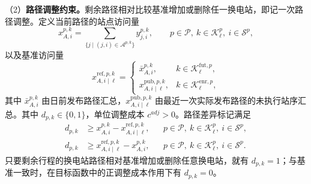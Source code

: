 \documentclass[12pt,a4paper,UTF8]{ctexart}
\begin{document}
（2）\textbf{路径调整约束。}剩余路径相对比较基准增加或删除任一换电站，即记一次路径调整。定义当前路径的站点访问量
\begin{equation}
x_{A,i}^{p,k}
=
\sum_{\{j\mid(j,i)\in\mathcal A^{p,k}\}}y_{j,i}^{p,k},
\qquad p\in\mathcal P,\ k\in\mathcal K_\ell^p,\ i\in\mathcal S^p,
\label{eq:station_visit_indicator}
\end{equation}
以及基准访问量
\begin{equation}
x_{A,i\mid\ell}^{\mathrm{ref},p,k}
=
\begin{cases}
\bar x_{A,i}^{p,k},
&k\in\mathcal K_\ell^{\mathrm{fut},p},\\
x_{A,i\mid\ell}^{\mathrm{pub},p,k},
&k\in\mathcal K_\ell^{\mathrm{enr},p},
\end{cases}
\label{eq:reference_visit_indicator}
\end{equation}
其中 $\bar x_{A,i}^{p,k}$ 由日前发布路径汇总，$x_{A,i\mid\ell}^{\mathrm{pub},p,k}$ 由最近一次实际发布路径的未执行站序汇总。其中 $d_{p,k}\in\{0,1\}$，单位调整成本 $c^{adj}>0$。路径差异标记满足
\begin{subequations}
\label{eq:path_adjustment_indicator}
\begin{align}
d_{p,k}
&\ge x_{A,i}^{p,k}-x_{A,i\mid\ell}^{\mathrm{ref},p,k},
&&p\in\mathcal P,\ k\in\mathcal K_\ell^p,\ i\in\mathcal S^p,\\
d_{p,k}
&\ge x_{A,i\mid\ell}^{\mathrm{ref},p,k}-x_{A,i}^{p,k},
&&p\in\mathcal P,\ k\in\mathcal K_\ell^p,\ i\in\mathcal S^p.
\end{align}
\end{subequations}
只要剩余行程的换电站路径相对基准增加或删除任意换电站，就有 $d_{p,k}=1$；与基准一致时，在目标函数中的正调整成本作用下有 $d_{p,k}=0$。
\end{document}
